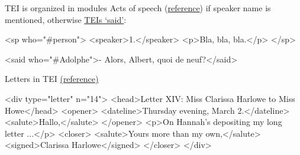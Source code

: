 


\begin{frame}[fragile]{TEI is organized in modules}
\footnotesize
Acts of speech (\href{http://www.tei-c.org/release/doc/tei-p5-doc/en/html/examples-sp.html}{reference}) if speaker name is mentioned, otherwise  \href{http://www.tei-c.org/release/doc/tei-p5-doc/en/html/examples-said.html}{TEIs `said'}:
\begin{xmlcode}
<sp who="#person">
    <speaker>1.</speaker> <p>Bla, bla, bla.</p>
</sp>

<said who="#Adolphe">- Alors, Albert, quoi de neuf?</said>
\end{xmlcode}

Letters in TEI \href{http://www.tei-c.org/release/doc/tei-p5-doc/en/html/DS.html#DSOC}{(reference)}

\begin{xmlcode}
<div type="letter" n="14">
    <head>Letter XIV: Miss Clarissa Harlowe to Miss Howe</head>
        <opener>
            <dateline>Thursday evening, March 2.</dateline>
            <salute>Hallo,</salute>
        </opener>
    <p>On Hannah's depositing my long letter ...</p>
    <closer>
        <salute>Yours more than my own,</salute>
        <signed>Clarissa Harlowe</signed>
    </closer>
</div>
\end{xmlcode}
\end{frame}

